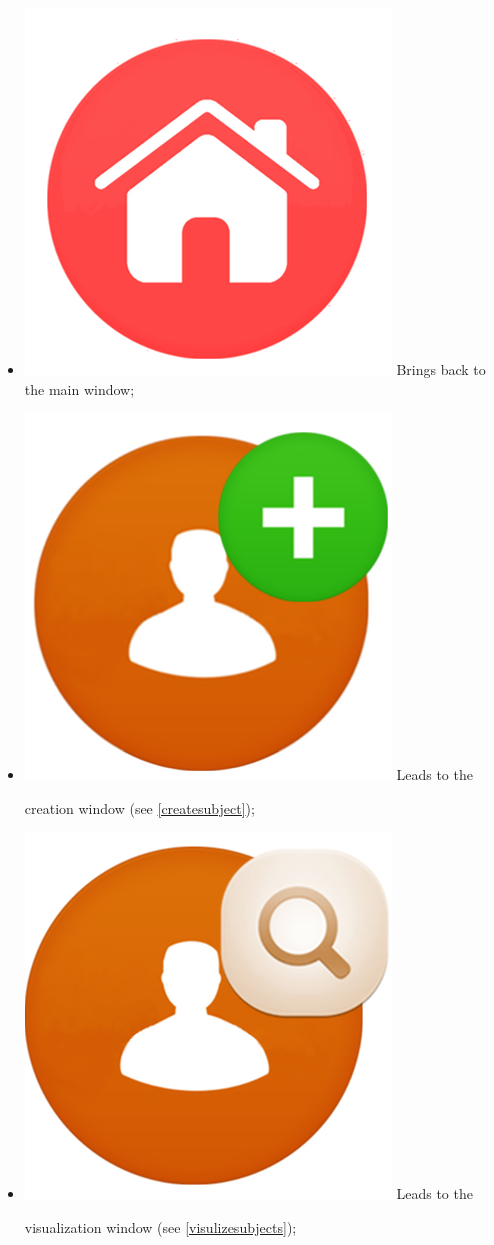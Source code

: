 \begin{itemize}
\item \includegraphics[scale=0.085]{./Images/home} Brings back to the main window;
\item \includegraphics[scale=0.08]{./Images/new_Subject} Leads to the \subject{} creation window (see \ref{createsubject});
\item \includegraphics[scale=0.08]{./Images/manage_Subjects} Leads to the \subject{} visualization window (see \ref{visulizesubjects});

\end{itemize}
